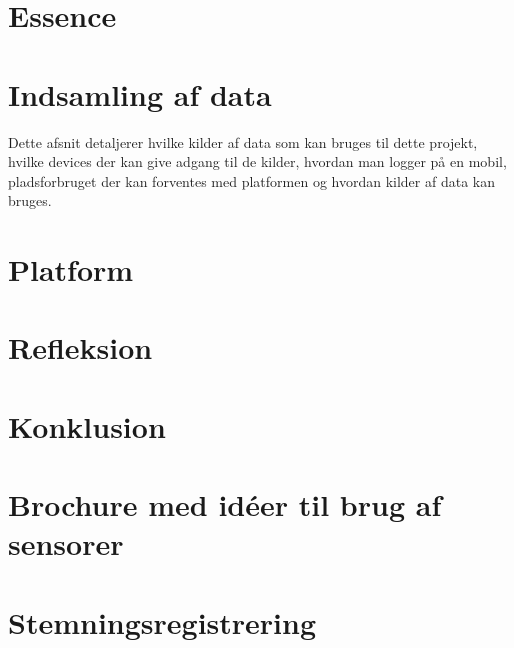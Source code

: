 












\chapter{Essence}






\chapter{Indsamling af data}
Dette afsnit detaljerer hvilke kilder af data som kan bruges til dette projekt, hvilke devices der kan give adgang til de kilder, hvordan man logger på en mobil, pladsforbruget der kan forventes med platformen og hvordan kilder af data kan bruges.







\chapter{Platform}\label{platform}






\chapter{Refleksion}\label{sec:refleksion}


\chapter{Konklusion}





\label{bib:mybiblio}

\appendix



\chapter{Brochure med idéer til brug af sensorer}\label{app:brochure}
 

\chapter{Stemningsregistrering}\label{app:stemningsregistrering}


